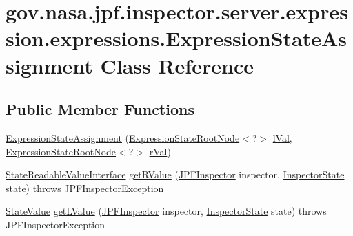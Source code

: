 \hypertarget{classgov_1_1nasa_1_1jpf_1_1inspector_1_1server_1_1expression_1_1expressions_1_1_expression_state_assignment}{}\section{gov.\+nasa.\+jpf.\+inspector.\+server.\+expression.\+expressions.\+Expression\+State\+Assignment Class Reference}
\label{classgov_1_1nasa_1_1jpf_1_1inspector_1_1server_1_1expression_1_1expressions_1_1_expression_state_assignment}
\subsection*{Public Member Functions}
\begin{DoxyCompactItemize}
\item 
\hyperlink{classgov_1_1nasa_1_1jpf_1_1inspector_1_1server_1_1expression_1_1expressions_1_1_expression_state_assignment_ac09dc1d600f275aea6cdae45cc91f9c7}{Expression\+State\+Assignment} (\hyperlink{interfacegov_1_1nasa_1_1jpf_1_1inspector_1_1server_1_1expression_1_1_expression_state_root_node}{Expression\+State\+Root\+Node}$<$?$>$ \hyperlink{classgov_1_1nasa_1_1jpf_1_1inspector_1_1server_1_1expression_1_1expressions_1_1_expression_state_assignment_ad6de82c2ceb7cfde3eda4788fc0068a4}{l\+Val}, \hyperlink{interfacegov_1_1nasa_1_1jpf_1_1inspector_1_1server_1_1expression_1_1_expression_state_root_node}{Expression\+State\+Root\+Node}$<$?$>$ \hyperlink{classgov_1_1nasa_1_1jpf_1_1inspector_1_1server_1_1expression_1_1expressions_1_1_expression_state_assignment_ac9be8f4277f7f3747a3a6a2de5895d73}{r\+Val})
\item 
\hyperlink{interfacegov_1_1nasa_1_1jpf_1_1inspector_1_1server_1_1programstate_1_1_state_readable_value_interface}{State\+Readable\+Value\+Interface} \hyperlink{classgov_1_1nasa_1_1jpf_1_1inspector_1_1server_1_1expression_1_1expressions_1_1_expression_state_assignment_a2c8d73bb76469b1fae6c990673922264}{get\+R\+Value} (\hyperlink{classgov_1_1nasa_1_1jpf_1_1inspector_1_1server_1_1jpf_1_1_j_p_f_inspector}{J\+P\+F\+Inspector} inspector, \hyperlink{interfacegov_1_1nasa_1_1jpf_1_1inspector_1_1server_1_1expression_1_1_inspector_state}{Inspector\+State} state)  throws J\+P\+F\+Inspector\+Exception 
\item 
\hyperlink{classgov_1_1nasa_1_1jpf_1_1inspector_1_1server_1_1programstate_1_1_state_value}{State\+Value} \hyperlink{classgov_1_1nasa_1_1jpf_1_1inspector_1_1server_1_1expression_1_1expressions_1_1_expression_state_assignment_a5294eea8bde4c6143ab4ccf94fa93c83}{get\+L\+Value} (\hyperlink{classgov_1_1nasa_1_1jpf_1_1inspector_1_1server_1_1jpf_1_1_j_p_f_inspector}{J\+P\+F\+Inspector} inspector, \hyperlink{interfacegov_1_1nasa_1_1jpf_1_1inspector_1_1server_1_1expression_1_1_inspector_state}{Inspector\+State} state)  throws J\+P\+F\+Inspector\+Exception 
\end{DoxyCompactItemize}
